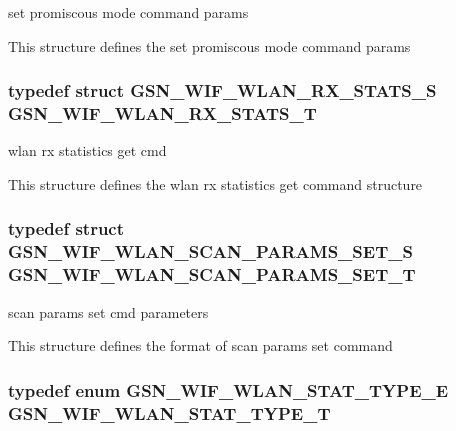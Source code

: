 set promiscous mode command params 

This structure defines the set promiscous mode command params \hypertarget{a00677_ga1bb08fff4c3ba2c6027ad054755e4df2}{
\subsubsection[{GSN\_\-WIF\_\-WLAN\_\-RX\_\-STATS\_\-T}]{\setlength{\rightskip}{0pt plus 5cm}typedef struct {\bf GSN\_\-WIF\_\-WLAN\_\-RX\_\-STATS\_\-S} {\bf GSN\_\-WIF\_\-WLAN\_\-RX\_\-STATS\_\-T}}}
\label{a00677_ga1bb08fff4c3ba2c6027ad054755e4df2}


wlan rx statistics get cmd 

This structure defines the wlan rx statistics get command structure \hypertarget{a00677_ga38fb363f219070729c31798116e9702c}{
\subsubsection[{GSN\_\-WIF\_\-WLAN\_\-SCAN\_\-PARAMS\_\-SET\_\-T}]{\setlength{\rightskip}{0pt plus 5cm}typedef struct {\bf GSN\_\-WIF\_\-WLAN\_\-SCAN\_\-PARAMS\_\-SET\_\-S} {\bf GSN\_\-WIF\_\-WLAN\_\-SCAN\_\-PARAMS\_\-SET\_\-T}}}
\label{a00677_ga38fb363f219070729c31798116e9702c}


scan params set cmd parameters 

This structure defines the format of scan params set command \hypertarget{a00677_ga64d9749befbab903d13eae1c816e40cf}{
\subsubsection[{GSN\_\-WIF\_\-WLAN\_\-STAT\_\-TYPE\_\-T}]{\setlength{\rightskip}{0pt plus 5cm}typedef enum {\bf GSN\_\-WIF\_\-WLAN\_\-STAT\_\-TYPE\_\-E}  {\bf GSN\_\-WIF\_\-WLAN\_\-STAT\_\-TYPE\_\-T}}}
\label{a00677_ga64d9749befbab903d13eae1c816e40cf}


